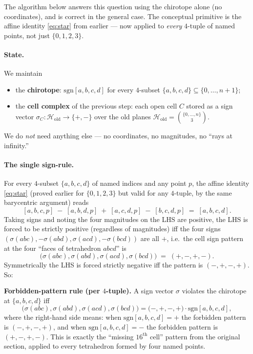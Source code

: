 \documentclass[11pt]{article}
\begin{document}
The algorithm below answers this question using the chirotope alone (no
coordinates), and is correct in the general case. The conceptual primitive is
the affine identity \eqref{eq:star} from earlier --- now applied to \emph{every}
$4$-tuple of named points, not just $\{0,1,2,3\}$.

\paragraph{State.} We maintain
\begin{itemize}
  \item the \textbf{chirotope}: $\mathrm{sgn}[a,b,c,d]$ for every $4$-subset
  $\{a,b,c,d\}\subseteq\{0,\ldots,n{+}1\}$;
  \item the \textbf{cell complex} of the previous step: each open cell $C$
  stored as a sign vector $\sigma_C : \mathcal{H}_{\mathrm{old}} \to \{+,-\}$
  over the old planes $\mathcal{H}_{\mathrm{old}} = \binom{\{0,\ldots,n\}}{3}$.
\end{itemize}
We do \emph{not} need anything else --- no coordinates, no magnitudes, no
``rays at infinity.''

\paragraph{The single sign-rule.} For every $4$-subset $\{a,b,c,d\}$ of named
indices and any point $p$, the affine identity \eqref{eq:star} (proved earlier
for $\{0,1,2,3\}$ but valid for any $4$-tuple, by the same barycentric
argument) reads
\[
  [a,b,c,p] \;-\; [a,b,d,p] \;+\; [a,c,d,p] \;-\; [b,c,d,p] \;=\; [a,b,c,d].
\]
Taking signs and noting the four magnitudes on the LHS are positive, the LHS
is forced to be strictly positive (regardless of magnitudes) iff the four
signs $(\sigma(abc), -\sigma(abd), \sigma(acd), -\sigma(bcd))$ are all $+$,
i.e.\ the cell sign pattern at the four ``faces of tetrahedron $abcd$'' is
\[
\bigl(\sigma(abc),\sigma(abd),\sigma(acd),\sigma(bcd)\bigr) \;=\; (+,-,+,-).
\]
Symmetrically the LHS is forced strictly negative iff the pattern is
$(-,+,-,+)$. So:

\noindent\textbf{Forbidden-pattern rule (per $4$-tuple).} A sign vector $\sigma$
violates the chirotope at $\{a,b,c,d\}$ iff
\[
\bigl(\sigma(abc),\sigma(abd),\sigma(acd),\sigma(bcd)\bigr) = \bigl(-,+,-,+\bigr)\cdot \mathrm{sgn}[a,b,c,d],
\]
where the right-hand side means: when $\mathrm{sgn}[a,b,c,d]=+$ the forbidden
pattern is $(-,+,-,+)$, and when $\mathrm{sgn}[a,b,c,d]=-$ the forbidden
pattern is $(+,-,+,-)$. This is exactly the ``missing $16^{\mathrm{th}}$ cell''
pattern from the original section, applied to every tetrahedron formed by four
named points.
\end{document}
